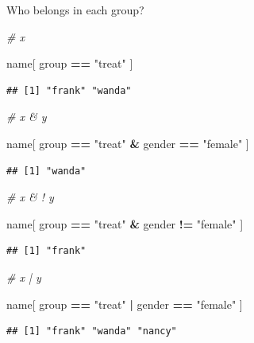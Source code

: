 \documentclass[]{book}
\newenvironment{Shaded}{\begin{snugshade}}{\end{snugshade}}
\newcommand{\CommentTok}[1]{\textcolor[rgb]{0.56,0.35,0.01}{\textit{#1}}}
\newcommand{\NormalTok}[1]{#1}
\newcommand{\OperatorTok}[1]{\textcolor[rgb]{0.81,0.36,0.00}{\textbf{#1}}}
\newcommand{\StringTok}[1]{\textcolor[rgb]{0.31,0.60,0.02}{#1}}
\theoremstyle{definition}
\theoremstyle{definition}
\theoremstyle{definition}
\theoremstyle{remark}
\begin{document}
Who belongs in each group?

\begin{Shaded}
\begin{Highlighting}[]
\CommentTok{#   x}

\NormalTok{name[ group }\OperatorTok{==}\StringTok{ "treat"}\NormalTok{ ]}
\end{Highlighting}
\end{Shaded}

\begin{verbatim}
## [1] "frank" "wanda"
\end{verbatim}

\begin{Shaded}
\begin{Highlighting}[]
\CommentTok{#   x & y}

\NormalTok{name[ group }\OperatorTok{==}\StringTok{ "treat"} \OperatorTok{&}\StringTok{ }\NormalTok{gender }\OperatorTok{==}\StringTok{ "female"}\NormalTok{ ]}
\end{Highlighting}
\end{Shaded}

\begin{verbatim}
## [1] "wanda"
\end{verbatim}

\begin{Shaded}
\begin{Highlighting}[]
\CommentTok{#   x & ! y}

\NormalTok{name[ group }\OperatorTok{==}\StringTok{ "treat"} \OperatorTok{&}\StringTok{ }\NormalTok{gender }\OperatorTok{!=}\StringTok{ "female"}\NormalTok{ ]}
\end{Highlighting}
\end{Shaded}

\begin{verbatim}
## [1] "frank"
\end{verbatim}

\begin{Shaded}
\begin{Highlighting}[]
\CommentTok{#  x | y}

\NormalTok{name[ group }\OperatorTok{==}\StringTok{ "treat"} \OperatorTok{|}\StringTok{ }\NormalTok{gender }\OperatorTok{==}\StringTok{ "female"}\NormalTok{ ]}
\end{Highlighting}
\end{Shaded}

\begin{verbatim}
## [1] "frank" "wanda" "nancy"
\end{verbatim}
\end{document}
